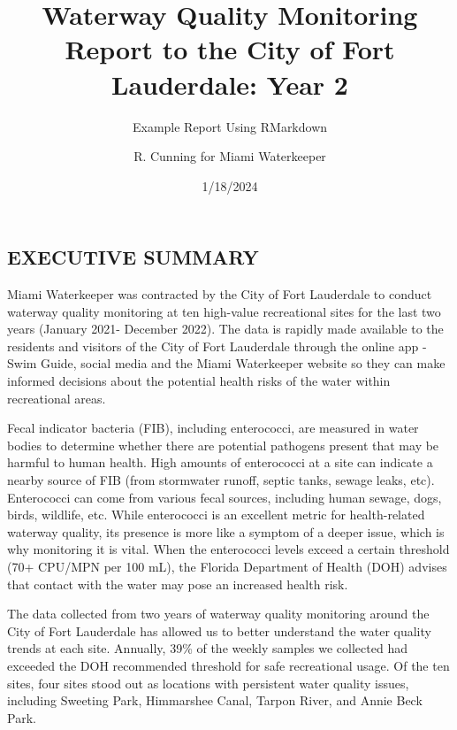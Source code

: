 \documentclass[
]{article}
\title{Waterway Quality Monitoring Report to the City of Fort Lauderdale: Year
2}
\subtitle{Example Report Using RMarkdown}
\author{R. Cunning for Miami Waterkeeper}
\date{1/18/2024}
\begin{document}
\maketitle

\hypertarget{executive-summary}{%
\subsection{EXECUTIVE SUMMARY}\label{executive-summary}}

Miami Waterkeeper was contracted by the City of Fort Lauderdale to
conduct waterway quality monitoring at ten high-value recreational sites
for the last two years (January 2021- December 2022). The data is
rapidly made available to the residents and visitors of the City of Fort
Lauderdale through the online app -Swim Guide, social media and the
Miami Waterkeeper website so they can make informed decisions about the
potential health risks of the water within recreational areas.

Fecal indicator bacteria (FIB), including enterococci, are measured in
water bodies to determine whether there are potential pathogens present
that may be harmful to human health. High amounts of enterococci at a
site can indicate a nearby source of FIB (from stormwater runoff, septic
tanks, sewage leaks, etc). Enterococci can come from various fecal
sources, including human sewage, dogs, birds, wildlife, etc. While
enterococci is an excellent metric for health-related waterway quality,
its presence is more like a symptom of a deeper issue, which is why
monitoring it is vital. When the enterococci levels exceed a certain
threshold (70+ CPU/MPN per 100 mL), the Florida Department of Health
(DOH) advises that contact with the water may pose an increased health
risk.

The data collected from two years of waterway quality monitoring around
the City of Fort Lauderdale has allowed us to better understand the
water quality trends at each site. Annually, 39\% of the weekly samples
we collected had exceeded the DOH recommended threshold for safe
recreational usage. Of the ten sites, four sites stood out as locations
with persistent water quality issues, including Sweeting Park,
Himmarshee Canal, Tarpon River, and Annie Beck Park.
\end{document}
